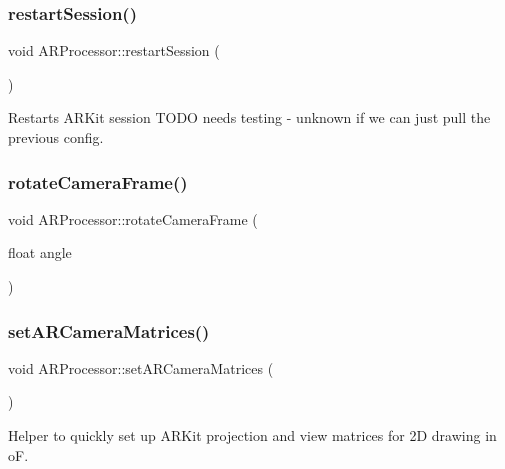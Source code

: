 \mbox{\label{class_a_r_processor_a121cd3925743680196771ce07058d52e}} 
\subsubsection{\texorpdfstring{restart\+Session()}{restartSession()}}
{\footnotesize\ttfamily void A\+R\+Processor\+::restart\+Session (\begin{DoxyParamCaption}{ }\end{DoxyParamCaption})}

Restarts A\+R\+Kit session T\+O\+DO needs testing -\/ unknown if we can just pull the previous config. \mbox{\label{class_a_r_processor_a2514281144c680e13c02562c74746ceb}} 
\subsubsection{\texorpdfstring{rotate\+Camera\+Frame()}{rotateCameraFrame()}}
{\footnotesize\ttfamily void A\+R\+Processor\+::rotate\+Camera\+Frame (\begin{DoxyParamCaption}\item[{float}]{angle }\end{DoxyParamCaption})}

\mbox{\label{class_a_r_processor_a2ffd8b9518388be29eba6affe4d4d152}} 
\subsubsection{\texorpdfstring{set\+A\+R\+Camera\+Matrices()}{setARCameraMatrices()}}
{\footnotesize\ttfamily void A\+R\+Processor\+::set\+A\+R\+Camera\+Matrices (\begin{DoxyParamCaption}{ }\end{DoxyParamCaption})}



Helper to quickly set up A\+R\+Kit projection and view matrices for 2D drawing in oF. 

